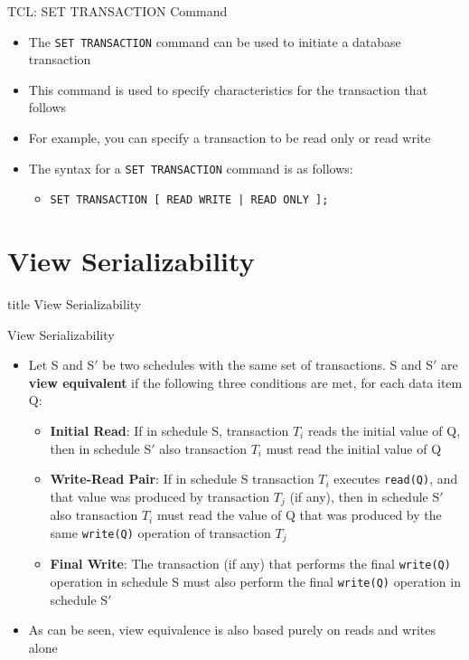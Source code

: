 \documentclass[aspectratio=169, xcolor=dvipsnames]{beamer}
\begin{document}
\begin{frame}{TCL: SET TRANSACTION Command}
    \begin{itemize}[<+->]
        \item The \texttt{SET TRANSACTION} command can be used to initiate a database transaction
        \item This command is used to specify characteristics for the transaction that follows
        \item For example, you can specify a transaction to be read only or read write
        \item The syntax for a \texttt{SET TRANSACTION} command is as follows:
        \begin{itemize}
            \item \texttt{SET TRANSACTION [ READ WRITE | READ ONLY ];}
        \end{itemize}
    \end{itemize}
\end{frame}

\section{View Serializability}

\begin{frame}
  \vfill
  \centering
  \begin{beamercolorbox}[sep=8pt,center,shadow=true,rounded=true]{title}
    View Serializability\par%
  \end{beamercolorbox}
  \vfill
\end{frame}

\begin{frame}{View Serializability}
    \begin{itemize}[<+->]
        \item Let S and S$'$ be two schedules with the same set of transactions. S and S$'$ are \textbf{view equivalent} if the following three conditions are met, for each data item Q:
        \begin{itemize}
            \item[$\triangleright$] \textbf{Initial Read}: If in schedule S, transaction $T_i$ reads the initial value of Q, then in schedule S$'$ also transaction $T_i$ must read the initial value of Q
            \item[$\triangleright$] \textbf{Write-Read Pair}: If in schedule S transaction $T_i$ executes \texttt{read(Q)}, and that value was produced by transaction $T_j$ (if any), then in schedule S$'$ also transaction $T_i$ must read the value of Q that was produced by the same \texttt{write(Q)} operation of transaction $T_j$
            \item[$\triangleright$] \textbf{Final Write}: The transaction (if any) that performs the final \texttt{write(Q)} operation in schedule S must also perform the final \texttt{write(Q)} operation in schedule S$'$
        \end{itemize}
        \item As can be seen, view equivalence is also based purely on reads and writes alone
    \end{itemize}
\end{frame}
\end{document}
